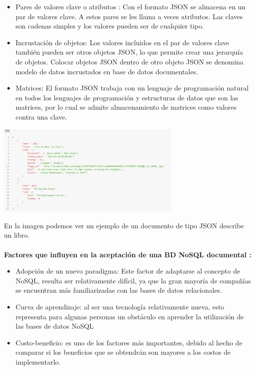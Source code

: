 \documentclass[%
 reprint,
 amsmath,amssymb,
 aps,
]{revtex4-1}
\begin{document}
\begin{itemize}
		\item Pares de valores clave o atributos :  Con el formato JSON se almacena en un par de valores clave. A estos pares se les llama a veces atributos. Las claves son cadenas simples y los valores pueden ser de cualquier tipo.\cite{kyocera}
		\item Incrustación de objetos: Los valores incluidos en el par de valores clave también pueden ser otros objetos JSON, lo que permite crear una jerarquía de objetos. Colocar objetos JSON dentro de otro objeto JSON se denomina modelo de datos incrustados en base de datos documentales.\cite{kyocera}
		\item Matrices: El formato JSON trabaja con un lenguaje de programación natural en todos los lenguajes de programación y estructuras de datos que son las matrices, por lo cual se admite almacenamiento de matrices como valores contra una clave. \cite{kyocera}
\end{itemize}
\begin{center}
	\includegraphics[width=9cm]{./Imagenes/documental2}
\end{center}	
En la imagen podemos ver un ejemplo de un documento de tipo JSON describe un libro.\cite{imagen}\\\\
\textbf{ Factores que influyen en la aceptación de una BD NoSQL documental :}
\begin{itemize}
		\item Adopción de un nuevo paradigma: Este factor de adaptarse al concepto de NoSQL, resulta ser relativamente difícil, ya que la gran mayoría de compañías se encuentran más familiarizadas con las bases de datos relacionales.
		\item Curva de aprendizaje: al ser una tecnología relativamente nueva, esto representa para algunas personas un obstáculo en aprender la utilización de las bases de datos NoSQL
		\item Costo-beneficio: es uno de los factores más importantes, debido al hecho de comparar si los beneficios que se obtendrán son mayores a los costos de implementarlo.                     
\end{itemize}
\end{document}
